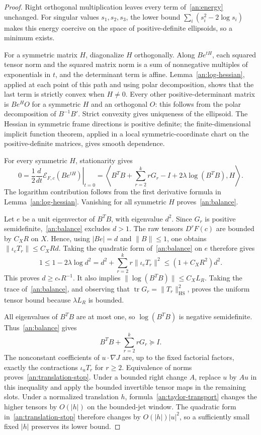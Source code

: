 \documentclass[11pt]{amsart}
\theoremstyle{definition}
\theoremstyle{remark}
\numberwithin{equation}{section}
\begin{document}
\begin{proof}
Right orthogonal multiplication leaves every term of~\eqref{an:energy} unchanged. For singular values $s_1,s_2,s_3$, the lower bound $\sum_i(s_i^2-2\log s_i)$ makes this energy coercive on the space of positive-definite ellipsoids, so a minimum exists.

For a symmetric matrix $H$, diagonalize $H$ orthogonally. Along $Be^{tH}$, each squared tensor norm and the squared matrix norm is a sum of nonnegative multiples of exponentials in $t$, and the determinant term is affine. Lemma~\ref{an:log-hessian}, applied at each point of this path and using polar decomposition, shows that the last term is strictly convex when $H\ne0$. Every other positive-determinant matrix is $Be^HO$ for a symmetric $H$ and an orthogonal $O$: this follows from the polar decomposition of $B^{-1}B'$. Strict convexity gives uniqueness of the ellipsoid. The Hessian in symmetric frame directions is positive definite; the finite-dimensional implicit function theorem, applied in a local symmetric-coordinate chart on the positive-definite matrices, gives smooth dependence.

For every symmetric $H$, stationarity gives
\[
0=\frac12\left.\frac{d}{dt}\mathscr E_{F,c}(Be^{tH})\right|_{t=0}=\left\langle B^TB+\sum_{r=2}^k rG_r-I+2\lambda\log(B^TB),H\right\rangle.
\]
The logarithm contribution follows from the first derivative formula in Lemma~\ref{an:log-hessian}. Vanishing for all symmetric $H$ proves~\eqref{an:balance}.

Let $e$ be a unit eigenvector of $B^TB$, with eigenvalue $d^2$. Since $G_r$ is positive semidefinite,~\eqref{an:balance} excludes $d>1$. The raw tensors $D^rF(c)$ are bounded by $C_XR$ on $X$. Hence, using $|Be|=d$ and $\|B\|\le1$, one obtains $\|\iota_eT_r\|\le C_XRd$. Taking the quadratic form of~\eqref{an:balance} on $e$ therefore gives
\[
1\le1-2\lambda\log d^2=d^2+\sum_{r=2}^kr\|\iota_eT_r\|^2\le(1+C_XR^2)d^2.
\]
This proves $d\ge c_*R^{-1}$. It also implies $\|\log(B^TB)\|\le C_XL_R$. Taking the trace of~\eqref{an:balance}, and observing that $\operatorname{tr}G_r=\|T_r\|_{\mathrm{HS}}^2$, proves the uniform tensor bound because $\lambda L_R$ is bounded.

All eigenvalues of $B^TB$ are at most one, so $\log(B^TB)$ is negative semidefinite. Thus~\eqref{an:balance} gives
\[
B^TB+\sum_{r=2}^krG_r\succeq I.
\]
The nonconstant coefficients of $u\cdot\nabla J$ are, up to the fixed factorial factors, exactly the contractions $\iota_uT_r$ for $r\ge2$. Equivalence of norms proves~\eqref{an:translation-stop}. Under a bounded right change $A$, replace $u$ by $Au$ in this inequality and apply the bounded invertible tensor maps in the remaining slots. Under a normalized translation $h$, formula~\eqref{an:taylor-transport} changes the higher tensors by $O(|h|)$ on the bounded-jet window. The quadratic form in~\eqref{an:translation-stop} therefore changes by $O(|h|)|u|^2$, so a sufficiently small fixed $|h|$ preserves its lower bound.
\end{proof}
\end{document}
